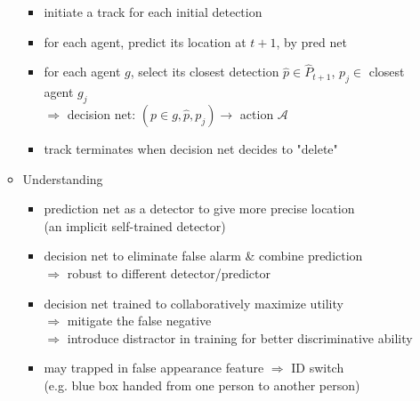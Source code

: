 \begin{itemize}
\begin{itemize}
\begin{itemize}
		\item initiate a track for each initial detection
		\item for each agent, predict its location at $t+1$, by pred net
		\item for each agent $g$, select its closest detection $\hat p \in \hat P_{t+1}$, $p_j\in$ closest agent $g_j$\\
		$\Rightarrow$ decision net: $(p\in g, \hat p, p_j) \rightarrow$ action $\mathcal A$ 
		\item track terminates when decision net decides to "delete"
		\end{itemize}
	\item Understanding
		\begin{itemize}
		\item prediction net as a detector to give more precise location \\
		(an implicit self-trained detector)
		\item decision net to eliminate false alarm \& combine prediction \\ 
		$\Rightarrow$ robust to different detector/predictor
		\item decision net trained to collaboratively maximize utility \\ 
		$\Rightarrow$ mitigate the false negative \\
		$\Rightarrow$ introduce distractor in training for better discriminative ability
		\item may trapped in false appearance feature $\Rightarrow$ ID switch \\ 
		(e.g. blue box handed from one person to another person)
		\end{itemize}
	\end{itemize}
\end{itemize}


